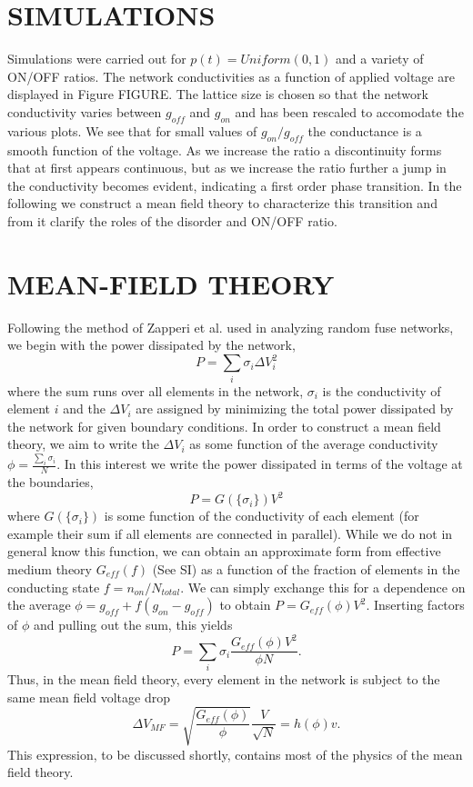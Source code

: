 \documentclass[aps,prl,preprint,groupedaddress]{revtex4-1}
\begin{document}
\section{SIMULATIONS}

Simulations were carried out for $p(t) = Uniform(0, 1)$ and a variety of
ON/OFF ratios. The network conductivities as a function of applied voltage
are displayed in Figure FIGURE. The lattice size is chosen so that the
network conductivity varies between $g_{off}$ and $g_{on}$ and has been
rescaled to accomodate the various plots.  We see that for small values
of $g_{on}/g_{off}$ the conductance is a smooth function of the voltage.
As we increase the ratio a discontinuity forms that at first appears
continuous, but as we increase the ratio further a jump in the
conductivity becomes evident, indicating a first order
phase transition. In the following we construct a mean field theory to
characterize this transition and from it clarify the roles of the disorder and
ON/OFF ratio.

\section{MEAN-FIELD THEORY}

Following the method of Zapperi et al. \cite{Zapperi1999} used in analyzing
random fuse networks,
we begin with the power dissipated by the network,
\[P = \sum_i \sigma_i \Delta V_i^2\]
where the sum runs over all elements in the network, $\sigma_i$ is the 
conductivity of element $i$  and the $\Delta V_i$ are assigned by minimizing
the total power dissipated by the network for given boundary conditions.
In order to construct a mean field theory, we aim to write the $\Delta V_i$ as
some function of the average conductivity $\phi = \frac{\sum_i \sigma_i}{N}$.
In this interest we  write the power dissipated in terms of the voltage at
the boundaries,
\[P = G(\{\sigma_i\}) V^2\]
where $G(\{\sigma_i\})$ is some function of the conductivity of each element
(for example their sum if all elements are connected in parallel). While we
do not in general know this function, we can obtain an approximate form
from effective medium theory $G_{eff}(f)$ (See SI) as a function of the fraction of
elements in the conducting state $f = n_{on}/N_{total}$. We can simply
exchange this for a dependence on the average
\(\phi = g_{off} + f(g_{on} - g_{off})\) to obtain
$P = G_{eff}(\phi) V^2$. Inserting factors of $\phi$ and pulling out the sum,
this yields
\[P = \sum_i \sigma_i \frac{G_{eff}(\phi)V^2}{\phi N}.\]
Thus, in the mean field theory, every element in the network is subject to
the same mean field voltage drop
\[\Delta V_{MF} = \sqrt{\frac{G_{eff}(\phi)}{\phi}}\frac{V}{\sqrt{N}} = h(\phi) v.\]
This expression, to be discussed shortly, contains most of the physics of
the mean field theory.
\end{document}
